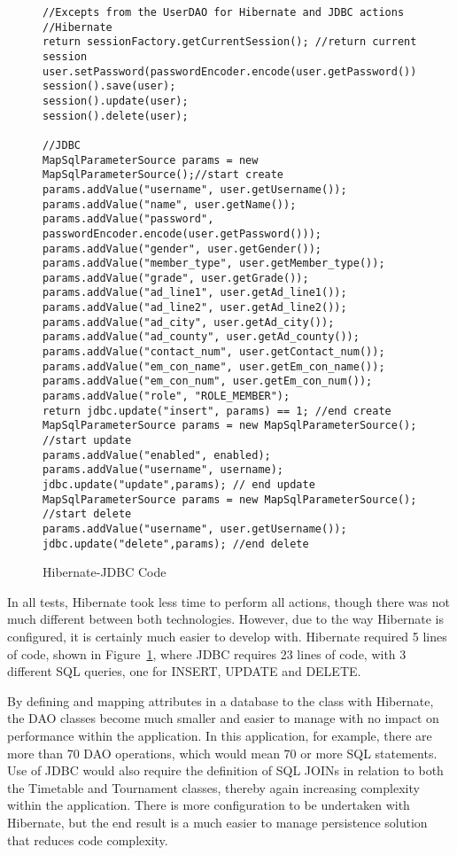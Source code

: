 \begin{figure}[H]
\begin{lstlisting}
//Excepts from the UserDAO for Hibernate and JDBC actions
//Hibernate
return sessionFactory.getCurrentSession(); //return current session
user.setPassword(passwordEncoder.encode(user.getPassword()));
session().save(user);
session().update(user);	
session().delete(user);

//JDBC
MapSqlParameterSource params = new MapSqlParameterSource();//start create
params.addValue("username", user.getUsername());
params.addValue("name", user.getName());
params.addValue("password", passwordEncoder.encode(user.getPassword()));
params.addValue("gender", user.getGender());
params.addValue("member_type", user.getMember_type());
params.addValue("grade", user.getGrade());
params.addValue("ad_line1", user.getAd_line1());
params.addValue("ad_line2", user.getAd_line2());
params.addValue("ad_city", user.getAd_city());
params.addValue("ad_county", user.getAd_county());
params.addValue("contact_num", user.getContact_num());
params.addValue("em_con_name", user.getEm_con_name());
params.addValue("em_con_num", user.getEm_con_num());
params.addValue("role", "ROLE_MEMBER");
return jdbc.update("insert", params) == 1; //end create
MapSqlParameterSource params = new MapSqlParameterSource(); //start update
params.addValue("enabled", enabled);
params.addValue("username", username);
jdbc.update("update",params); // end update
MapSqlParameterSource params = new MapSqlParameterSource(); //start delete
params.addValue("username", user.getUsername());
jdbc.update("delete",params); //end delete
\end{lstlisting}
\caption{Hibernate-JDBC Code}
\label{fig:jdbchibcode}
\end{figure}

In all tests, Hibernate took less time to perform all actions, though there was not much different between both technologies. However, due to the way Hibernate is configured, it is certainly much easier to develop with. Hibernate required 5 lines of code, shown in Figure~\ref{fig:jdbchibcode}, where JDBC requires 23 lines of code, with 3 different SQL queries, one for INSERT, UPDATE and DELETE. 

By defining and mapping attributes in a database to the class with Hibernate, the DAO classes become much smaller and easier to manage with no impact on performance within the application. In this application, for example, there are more than 70 DAO operations, which would mean 70 or more SQL statements. Use of JDBC would also require the definition of SQL JOINs in relation to both the Timetable and Tournament classes, thereby again increasing complexity within the application. There is more configuration to be undertaken with Hibernate, but the end result is a much easier to manage persistence solution that reduces code complexity.

